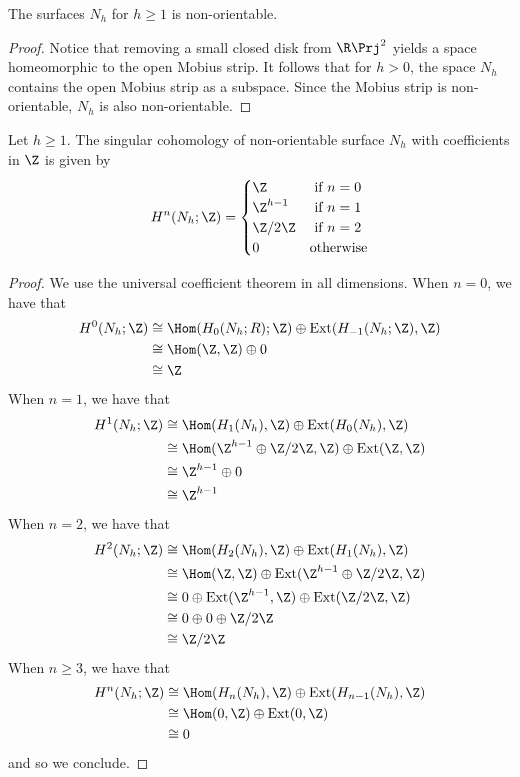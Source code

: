 \documentclass[a4paper]{article}
\begin{document}
\begin{crl}{}{} The surfaces $N_h$ for $h\geq 1$ is non-orientable. 
\begin{proof}
Notice that removing a small closed disk from $\R\Prj^2$ yields a space homeomorphic to the open Mobius strip. It follows that for $h>0$, the space $N_h$ contains the open Mobius strip as a subspace. Since the Mobius strip is non-orientable, $N_h$ is also non-orientable. 
\end{proof}
\end{crl}

\begin{prp}{}{} Let $h\geq 1$. The singular cohomology of non-orientable surface $N_h$ with coefficients in $\Z$ is given by $$H^n(N_h;\Z)=\begin{cases}
\Z & \text{ if } n=0\\
\Z^{h-1} & \text{ if } n=1\\
\Z/2\Z & \text{ if } n=2\\
0 & \text{otherwise}
\end{cases}$$ 
\begin{proof}
We use the universal coefficient theorem in all dimensions. 
When $n=0$, we have that 
\begin{align*}
H^0(N_h;\Z)&\cong\Hom(H_0(N_h;R);\Z)\oplus\text{Ext}(H_{-1}(N_h;\Z),\Z)\\
&\cong\Hom(\Z,\Z)\oplus 0\\
&\cong\Z
\end{align*}
When $n=1$, we have that 
\begin{align*}
H^1(N_h;\Z)&\cong\Hom(H_1(N_h),\Z)\oplus\text{Ext}(H_0(N_h),\Z)\\
&\cong\Hom(\Z^{h-1}\oplus\Z/2\Z,\Z)\oplus\text{Ext}(\Z,\Z)\\
&\cong\Z^{h-1}\oplus 0\\
&\cong\Z^{h-1}
\end{align*}
When $n=2$, we have that 
\begin{align*}
H^2(N_h;\Z)&\cong\Hom(H_2(N_h),\Z)\oplus\text{Ext}(H_1(N_h),\Z)\\
&\cong\Hom(\Z,\Z)\oplus\text{Ext}(\Z^{h-1}\oplus\Z/2\Z,\Z)\\
&\cong 0\oplus\text{Ext}(\Z^{h-1},\Z)\oplus\text{Ext}(\Z/2\Z,\Z)\\
&\cong 0\oplus 0\oplus \Z/2\Z\\
&\cong\Z/2\Z
\end{align*}
When $n\geq 3$, we have that 
\begin{align*}
H^n(N_h;\Z)&\cong\Hom(H_n(N_h),\Z)\oplus\text{Ext}(H_{n-1}(N_h),\Z)\\
&\cong\Hom(0,\Z)\oplus\text{Ext}(0,\Z)\\
&\cong 0
\end{align*}
and so we conclude. 
\end{proof}
\end{prp}
\end{document}
